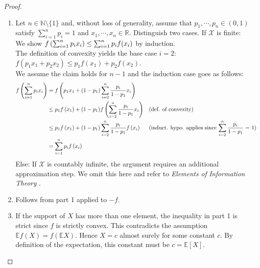 \begin{proof}
    \begin{enumerate}
        \item
            Let $n \in \mathbb{N} \setminus \{1\}$ and, without loss of generality, assume that $p_1, \cdots, p_n \in (0, 1)$ satisfy $\sum_{i=1}^{n}{p_i} = 1$ and $x_1, \cdots, x_n \in \mathbb{R}$.
            Distinguish two cases. If $\mathcal{X}$ is finite:
            We show $f\left(\sum_{i=1}^{n}{p_i x_i}\right) \le \sum_{i=1}^{n}{p_i f(x_i)}$ by induction. \\
            The definition of convexity yields the base case $i = 2$: $f(p_1 x_1 + p_2 x_2) \le p_1 f(x_1) + p_2 f(x_2)$. \\
            We assume the claim holds for $n - 1$ and the induction case goes as follows: \\
            \begin{align*}
                f\left(\sum_{i=1}^{n}{p_i x_i}\right) &= f\left(p_1 x_1 + (1 - p_1) \sum_{i=2}^{n}{\frac{p_i}{1 - p_1} x_i}\right) \\          
                &\le p_1 f\left(x_1\right) + (1 - p_1) f\left(\sum_{i=2}^{n}{\frac{p_i}{1 - p_1} x_i}\right)              && \text{(def. of convexity)} \\
                &\le p_1 f\left(x_1\right) + (1 - p_1) \sum_{i=2}^{n}{\frac{p_i}{1 - p_1} f\left({x_i}\right)}         
                && \text{(induct. hypo. applies since $\sum_{i = 2}^{n}{\frac{p_i}{1 - p_1}}$ = 1)} \\
                &= \sum_{i=1}^{n}{p_i f\left({x_i}\right)}
            \end{align*}
            Else: If $\mathcal{X}$ is countably infinite, the argument requires an additional approximation step.
            We omit this here and refer to \textit{Elements of Information Theory} \cite{Thomas:ElementsOfInformationTheory}.

        \item
            Follows from part 1 applied to $-f$.

        \item
            If the support of $X$ has more than one element, the inequality in part 1 is strict since $f$ is strictly convex.
            This contradicts the assumption $\mathbb{E} f(X) = f(\mathbb{E} X)$.
            Hence $X = c$ almost surely for some constant $c$.
            By definition of the expectation, this constant must be $c = \mathbb{E}[X]$.
    \end{enumerate}
\end{proof}


